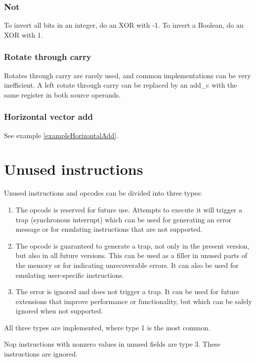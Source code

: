 \documentclass[forwardcom.tex]{subfiles}
\begin{document}
\subsubsection{Not}
To invert all bits in an integer, do an XOR with -1. To invert a Boolean, do an XOR with 1.

\subsubsection{Rotate through carry}
Rotates through carry are rarely used, and common implementations can be very inefficient. A left rotate through carry can be replaced by an add\_c with the same register in both source operands.

\subsubsection{Horizontal vector add} \label{horizontalVectorAdd}
See example \ref{exampleHorizontalAdd}.
\vspace{2mm}

\section{Unused instructions} \label{unusedInstructions}
Unused instructions and opcodes can be divided into three types:

\begin{enumerate}
\item The opcode is reserved for future use. Attempts to execute it will trigger a trap (synchronous interrupt) which can be used for generating an error message or for emulating instructions that are not supported.
\item The opcode is guaranteed to generate a trap, not only in the present version, but also in all future versions. This can be used as a filler in unused parts of the memory or for indicating unrecoverable errors. It can also be used for emulating user-specific instructions.
\item The error is ignored and does not trigger a trap. It can be used for future extensions that improve performance or functionality, but which can be safely ignored when not supported.
\end{enumerate}

All three types are implemented, where type 1 is the most common.
\vspace{2mm}

Nop instructions with nonzero values in unused fields are type 3. These instructions are ignored.
\vspace{2mm}
\end{document}

